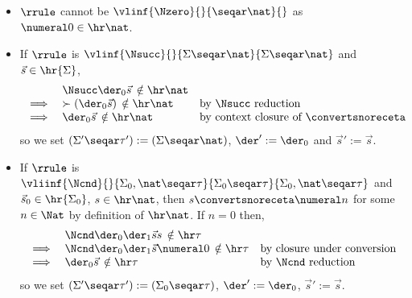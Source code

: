 \begin{definition}
\begin{itemize}
\[\]
Now, if $\der_0\, \vec s_0 \ \notin \hr{\tau_0}$ then we set $(\Sigma'\seqar \tau') := (\Sigma_0 \seqar \tau_0)$, $\der' := \der_0$ and $\vec s' := \vec s_0$.
Otherwise $\der_0\, \vec s_0 \ \in \hr{\tau_0}$ so we set 
$(\Sigma'\seqar \tau') := (\Sigma_1 \seqar \tau_1)$, $\der' := \der_1$ and $\vec s' := (\vec s_1, \der_0\, \vec s_0)$.
\item $\rrule$ cannot be 
\(
\vlinf{\Nzero}{}{\seqar \nat}{}
\)
as $\numeral 0 \in \hr \nat$.
\item If $\rrule$ is
\(
\vlinf{\Nsucc}{}{\Sigma \seqar \nat}{\Sigma \seqar \nat}
\)
and $\vec s \in \hr{\Sigma}$,
\[
\begin{array}{rll}
     & \Nsucc \der_0  \vec s \, \notin \hr\nat \\
     \implies & \succ (\der_0 \vec s) \, \notin \hr \nat & \text{by $\Nsucc $ reduction} \\
     \implies & \der_0 \vec s \, \notin \hr \nat  & \text{by context closure of $\convertsnoreceta$}
\end{array}
\]
so we set $(\Sigma'\seqar \tau'):= (\Sigma \seqar \nat)$, $\der' := \der_0$ and $\vec s' := \vec s$.
\item If $\rrule$ is
\(
\vliinf{\Ncnd}{}{\Sigma_0,\nat \seqar \tau}{\Sigma_0 \seqar \tau}{\Sigma_0,\nat \seqar \tau}
\)
and $\vec s_0 \in \hr{\Sigma_0}$, $s \in \hr \nat$, then $s\convertsnoreceta \numeral n$ for some $n\in \Nat$ by definition of $\hr\nat$.
If $n=0$ then,
\[
\begin{array}{rll}
     &  \Ncnd \der_0 \der_1 \vec s s \, \notin \hr \tau \\
     \implies & \Ncnd \der_0\der_1 \vec s \numeral 0 \, \notin \hr \tau & \text{by closure under conversion} \\
     \implies & \der_0 \vec s \, \notin \hr \tau & \text{by $\Ncnd$ reduction}
\end{array}
\]
so we set $(\Sigma'\seqar \tau'):= (\Sigma_0 \seqar \tau)$, $\der':= \der_0$, $\vec s' := \vec s$.


\end{itemize}
\end{definition}
